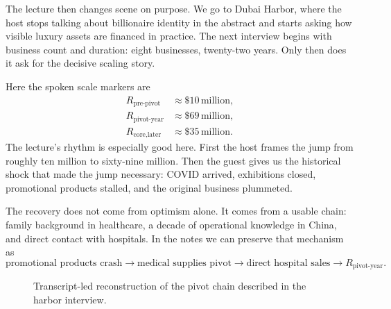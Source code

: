 The lecture then changes scene on purpose. We go to Dubai Harbor, where the host stops talking about billionaire identity in the abstract and starts asking how visible luxury assets are financed in practice. The next interview begins with business count and duration: eight businesses, twenty-two years. Only then does it ask for the decisive scaling story.

Here the spoken scale markers are
\begin{align}
R_{\text{pre-pivot}} &\approx \$10\,\text{million}, \\
R_{\text{pivot-year}} &\approx \$69\,\text{million}, \\
R_{\text{core,later}} &\approx \$35\,\text{million}.
\end{align}
The lecture's rhythm is especially good here. First the host frames the jump from roughly ten million to sixty-nine million. Then the guest gives us the historical shock that made the jump necessary: COVID arrived, exhibitions closed, promotional products stalled, and the original business plummeted.

The recovery does not come from optimism alone. It comes from a usable chain: family background in healthcare, a decade of operational knowledge in China, and direct contact with hospitals. In the notes we can preserve that mechanism as
\begin{equation}
\text{promotional products crash}
\to
\text{medical supplies pivot}
\to
\text{direct hospital sales}
\to
R_{\text{pivot-year}}.
\end{equation}

\begin{figure}[h]
\centering
{}
\caption{Transcript-led reconstruction of the pivot chain described in the harbor interview.}
\end{figure}

